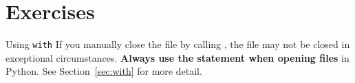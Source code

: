 \documentclass[11pt]{cselabheader}
\begin{document}
%
%
%
%
%
%

\section{Exercises}\label{exercises}

\begin{warningbox}{Using \texttt{with}}
  If you manually close the file by calling ,
  the file may not be closed in exceptional circumstances.
  \textbf{Always use the  statement when opening files} in Python.
  See Section~\ref{sec:with} for more detail.
\end{warningbox}
\end{document}
